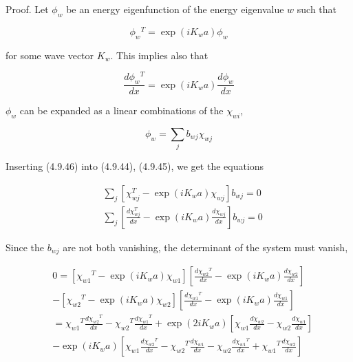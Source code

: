 \documentclass{article}
\begin{document}
Proof. Let $\phi_{w}$ be an energy eigenfunction of the energy eigenvalue $w$ such that
 
\begin{equation*}
\phi_{w}{ }^{T}=\exp \left(i K_{w} a\right) \phi_{w} \tag{4.9.44}
\end{equation*}
 
for some wave vector $K_{w}$. This implies also that
 
\begin{equation*}
\frac{d \phi_{w}{ }^{T}}{d x}=\exp \left(i K_{w} a\right) \frac{d \phi_{w}}{d x} \tag{4.9.45}
\end{equation*}
 
$\phi_{w}$ can be expanded as a linear combinations of the $\chi_{w i}$,
 
\begin{equation*}
\phi_{w}=\sum_{j} b_{w j} \chi_{w j} \tag{4.9.46}
\end{equation*}
 

Inserting (4.9.46) into (4.9.44), (4.9.45), we get the equations
 
\begin{align*}
& \sum_{j}\left[\chi_{w j}^{T}-\exp \left(i K_{w} a\right) \chi_{w j}\right] b_{w j}=0  \tag{4.9.47a}\\
& \sum_{j}\left[\frac{d \chi_{w j}^{T}}{d x}-\exp \left(i K_{w} a\right) \frac{d \chi_{w j}}{d x}\right] b_{w j}=0 \tag{4.9.47b}
\end{align*}
 

Since the $b_{w j}$ are not both vanishing, the determinant of the system must vanish,
 
\begin{align*}
& 0=\left[\chi_{w 1}{ }^{T}-\exp \left(i K_{w} a\right) \chi_{w 1}\right]\left[\frac{d \chi_{w 2}{ }^{T}}{d x}-\exp \left(i K_{w} a\right) \frac{d \chi_{w 2}}{d x}\right]  \tag{4.9.48}\\
& -\left[\chi_{w 2}{ }^{T}-\exp \left(i K_{w} a\right) \chi_{w 2}\right]\left[\frac{d \chi_{w 1}{ }^{T}}{d x}-\exp \left(i K_{w} a\right) \frac{d \chi_{w 1}}{d x}\right] \\
& =\chi_{w 1}{ }^{T} \frac{d \chi_{w 2}{ }^{T}}{d x}-\chi_{w 2}{ }^{T} \frac{d \chi_{w 1}{ }^{T}}{d x}+\exp \left(2 i K_{w} a\right)\left[\chi_{w 1} \frac{d \chi_{w 2}}{d x}-\chi_{w 2} \frac{d \chi_{w 1}}{d x}\right] \\
& -\exp \left(i K_{w} a\right)\left[\chi_{w 1} \frac{d \chi_{w 2}{ }^{T}}{d x}-\chi_{w 2}{ }^{T} \frac{d \chi_{w 1}}{d x}-\chi_{w 2} \frac{d \chi_{w 1}{ }^{T}}{d x}+\chi_{w 1}{ }^{T} \frac{d \chi_{w 2}}{d x}\right]
\end{align*}
 
\end{document}

